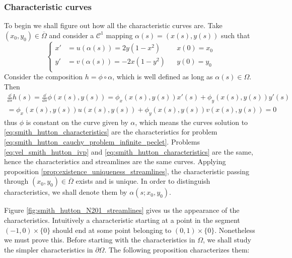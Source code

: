 \subsubsection*{Characteristic curves}

To begin we shall figure out how all the characteristic curves are. Take $(x_0,
y_0) \in \overline{\Omega}$ and consider a $\mathcal{C}^1$ mapping $\alpha(s) =
(x(s), y(s))$ such that
\begin{equation} \label{eq:smith_hutton_characteristics}
	\left\{
		\begin{aligned}
			x' &= u(\alpha(s)) = 2 y (1 - x^2) 		& &x(0) = x_0 \\
			y' &= v(\alpha(s)) = - 2 x (1 - y^2) 	& &y(0) = y_0 \\
		\end{aligned}
	\right.
\end{equation}
Consider the composition $h = \phi \circ \alpha$, which is well defined as long
as $\alpha(s) \in \Omega$. Then
\begin{multline}
	\frac{\dd}{\dd{s}} h(s) = 
	\frac{\dd}{\dd{s}} \phi(x(s), y(s)) = 
	\phi_x(x(s), y(s)) x'(s) + \phi_y(x(s), y(s)) y'(s) \\ =
	\phi_x(x(s), y(s)) u(x(s), y(s)) + 
	\phi_y(x(s), y(s)) v(x(s), y(s)) = 0 \label{eq:smith_hutton_derivative_composition}
\end{multline}
thus $\phi$ is constant on the curve given by $\alpha$, which means the curves
solution to \eqref{eq:smith_hutton_characteristics} are the characteristics for
problem \eqref{eq:smith_hutton_cauchy_problem_infinite_peclet}. Problems
\eqref{eq:vel_smith_hutton_ivp} and \eqref{eq:smith_hutton_characteristics} are
the same, hence the characteristics and streamlines are the same curves.
Applying proposition \eqref{prop:existence_uniqueness_streamlines}, the
characteristic passing through $(x_0, y_0) \in \overline{\Omega}$ exists and is
unique. In order to distinguish characteristics, we shall denote them by
$\alpha(s;x_0,y_0)$. 

Figure \ref{fig:smith_hutton_N201_streamlines} gives us the appearance of the
characteristics. Intuitively a characteristic starting at a point in the segment
$(-1,0) \times \{0\}$ should end at some point belonging to $(0,1) \times
\{0\}$. Nonetheless we must prove this. Before starting with the characteristics
in $\Omega$, we shall study the simpler characteristics in $\partial \Omega$.
The following proposition characterizes them:

